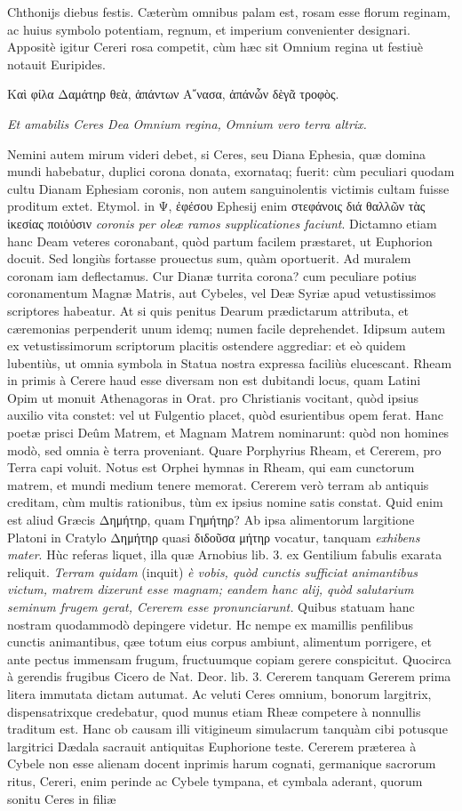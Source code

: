 \documentclass[a4paper, 11pt, oneside, polutonikogreek, latin]{article}
\begin{document}
Chthonijs diebus festis. Cæterùm omnibus palam est, rosam esse florum reginam, ac huius symbolo potentiam, regnum, et imperium convenienter designari. Appositè igitur Cereri rosa competit, cùm hæc sit Omnium regina ut festiuè notauit Euripides.

Καὶ φίλα Δαμάτηρ θεὰ, ἁπάντων
Α῎νασα, ἁπάνὧν δὲγᾶ τροφὸς.

\emph{Et amabilis Ceres Dea Omnium regina,}
\emph{Omnium vero terra altrix.}

Nemini autem mirum videri debet, si Ceres, seu Diana Ephesia, quæ domina mundi habebatur, duplici corona donata, exornataq; fuerit: cùm peculiari quodam cultu Dianam Ephesiam coronis, non autem sanguinolentis victimis cultam fuisse proditum extet. Etymol. in Ψ, ἐφέσου Ephesij enim στεφάνοις διά θαλλῶν τὰς ἱκεσίας ποιὁὐσιν \emph{coronis per oleæ ramos supplicationes faciunt}. Dictamno etiam hanc Deam veteres coronabant, quòd partum facilem præstaret, ut Euphorion docuit. Sed longiùs fortasse prouectus sum, quàm oportuerit. Ad muralem coronam iam deflectamus. Cur Dianæ turrita corona? cum peculiare potius coronamentum Magnæ Matris, aut Cybeles, vel Deæ Syriæ apud vetustissimos scriptores habeatur. At si quis penitus Dearum prædictarum attributa, et cæremonias perpenderit unum idemq; numen facile deprehendet. Idipsum autem ex vetustissimorum scriptorum placitis ostendere aggrediar: et eò quidem lubentiùs, ut omnia symbola in Statua nostra expressa faciliùs elucescant. Rheam in primis à Cerere haud esse diversam non est dubitandi locus, quam Latini Opim ut monuit Athenagoras in Orat. pro Christianis vocitant, quòd ipsius auxilio vita constet: vel ut Fulgentio placet, quòd esurientibus opem ferat. Hanc poetæ prisci Deûm Matrem, et Magnam Matrem nominarunt: quòd non homines modò, sed omnia è terra proveniant. Quare Porphyrius Rheam, et Cererem, pro Terra capi voluit. Notus est Orphei hymnas in Rheam, qui eam cunctorum matrem, et mundi medium tenere memorat. Cererem verò terram ab antiquis creditam, cùm multis rationibus, tùm ex ipsius nomine satis constat. Quid enim est aliud Græcis Δημήτηρ, quam Γημήτηρ? Ab ipsa alimentorum largitione Platoni in Cratylo Δημήτηρ quasi διδοῦσα μήτηρ vocatur, tanquam \emph{exhibens mater}. Hùc referas liquet, illa quæ Arnobius lib. 3. ex Gentilium fabulis exarata reliquit. \emph{Terram quidam} (inquit) \emph{è vobis, quòd cunctis sufficiat animantibus victum, matrem dixerunt esse magnam; eandem hanc alij, quòd salutarium seminum frugem gerat, Cererem esse pronunciarunt.} Quibus statuam hanc nostram quodammodò depingere videtur. Hc nempe ex mamillis penfilibus cunctis animantibus, qæe totum eius corpus ambiunt, alimentum porrigere, et ante pectus immensam frugum, fructuumque copiam gerere conspicitut. Quocirca à gerendis frugibus Cicero de Nat. Deor. lib. 3. Cererem tanquam Gererem prima litera immutata dictam autumat. Ac veluti Ceres omnium, bonorum largitrix, dispensatrixque credebatur, quod munus etiam Rheæ competere à nonnullis traditum est. Hanc ob causam illi vitigineum simulacrum tanquàm cibi potusque largitrici Dædala sacrauit antiquitas Euphorione teste. Cererem præterea à Cybele non esse alienam docent inprimis harum cognati, germanique sacrorum ritus, Cereri, enim perinde ac Cybele tympana, et cymbala aderant, quorum sonitu Ceres in filiæ 
\end{document}
